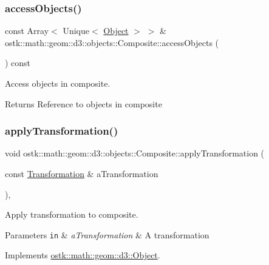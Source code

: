 \subsubsection{\texorpdfstring{access\+Objects()}{accessObjects()}}
{\footnotesize\ttfamily const Array$<$ Unique$<$ \hyperlink{classostk_1_1math_1_1geom_1_1d3_1_1_object}{Object} $>$ $>$ \& ostk\+::math\+::geom\+::d3\+::objects\+::\+Composite\+::access\+Objects (\begin{DoxyParamCaption}{ }\end{DoxyParamCaption}) const}



Access objects in composite. 

\begin{DoxyReturn}{Returns}
Reference to objects in composite 
\end{DoxyReturn}
\mbox{\label{classostk_1_1math_1_1geom_1_1d3_1_1objects_1_1_composite_a2d99d6b4096c2f5ba3175f886e2e2c7d}} 
\subsubsection{\texorpdfstring{apply\+Transformation()}{applyTransformation()}}
{\footnotesize\ttfamily void ostk\+::math\+::geom\+::d3\+::objects\+::\+Composite\+::apply\+Transformation (\begin{DoxyParamCaption}\item[{const \hyperlink{classostk_1_1math_1_1geom_1_1d3_1_1_transformation}{Transformation} \&}]{a\+Transformation }\end{DoxyParamCaption})\hspace{0.3cm}{\ttfamily [override]}, {\ttfamily [virtual]}}



Apply transformation to composite. 


\begin{DoxyParams}[1]{Parameters}
\mbox{\tt in}  & {\em a\+Transformation} & A transformation \\
\hline
\end{DoxyParams}


Implements \hyperlink{classostk_1_1math_1_1geom_1_1d3_1_1_object_ae9194dd6d2bb4df09292ffc84dccdb1d}{ostk\+::math\+::geom\+::d3\+::\+Object}.

